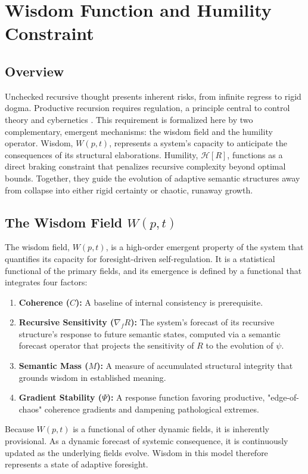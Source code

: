 \chapter{Wisdom Function and Humility Constraint}

\section{Overview}

Unchecked recursive thought presents inherent risks, from infinite regress to rigid dogma. Productive recursion requires regulation, a principle central to control theory and cybernetics \autocite{Kalman1960, AndersonMoore1990, Wiener1948, Ashby1952}. This requirement is formalized here by two complementary, emergent mechanisms: the wisdom field and the humility operator. Wisdom, \(W(p,t)\), represents a system's capacity to anticipate the consequences of its structural elaborations. Humility, \(\mathcal{H}[R]\), functions as a direct braking constraint that penalizes recursive complexity beyond optimal bounds. Together, they guide the evolution of adaptive semantic structures away from collapse into either rigid certainty or chaotic, runaway growth.

\section{The Wisdom Field \(W(p, t)\)}

The wisdom field, \(W(p, t)\), is a high-order emergent property of the system that quantifies its capacity for foresight-driven self-regulation. It is a statistical functional of the primary fields, and its emergence is defined by a functional that integrates four factors:
\begin{enumerate}
    \item \textbf{Coherence (\(C\)):} A baseline of internal consistency is prerequisite.
    \item \textbf{Recursive Sensitivity (\(\nabla_f R\)):} The system's forecast of its recursive structure's response to future semantic states, computed via a semantic forecast operator that projects the sensitivity of \(R\) to the evolution of \(\psi\).
    \item \textbf{Semantic Mass (\(M\)):} A measure of accumulated structural integrity that grounds wisdom in established meaning.
    \item \textbf{Gradient Stability (\(\Psi\)):} A response function favoring productive, "edge-of-chaos" coherence gradients and dampening pathological extremes.
\end{enumerate}
Because \(W(p,t)\) is a functional of other dynamic fields, it is inherently provisional. As a dynamic forecast of systemic consequence, it is continuously updated as the underlying fields evolve. Wisdom in this model therefore represents a state of adaptive foresight.

